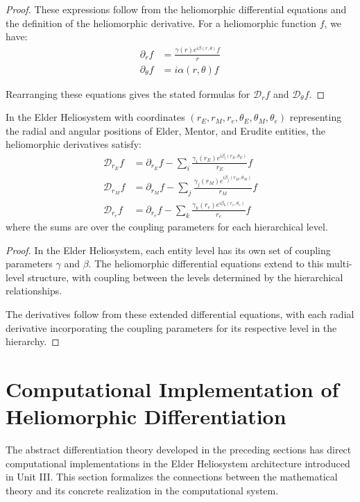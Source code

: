 \begin{proof}
These expressions follow from the heliomorphic differential equations and the definition of the heliomorphic derivative. For a heliomorphic function $f$, we have:
\begin{align}
\partial_rf &= \frac{\gamma(r)e^{i\beta(r,\theta)}f}{r}\\
\partial_\theta f &= i\alpha(r,\theta)f
\end{align}

Rearranging these equations gives the stated formulas for $\mathcal{D}_rf$ and $\mathcal{D}_\theta f$.
\end{proof}

\begin{theorem}
In the Elder Heliosystem with coordinates $(r_E, r_M, r_e, \theta_E, \theta_M, \theta_e)$ representing the radial and angular positions of Elder, Mentor, and Erudite entities, the heliomorphic derivatives satisfy:
\begin{align}
\mathcal{D}_{r_E}f &= \partial_{r_E}f - \sum_{i} \frac{\gamma_i(r_E)e^{i\beta_i(r_E,\theta_E)}}{r_E}f\\
\mathcal{D}_{r_M}f &= \partial_{r_M}f - \sum_{j} \frac{\gamma_j(r_M)e^{i\beta_j(r_M,\theta_M)}}{r_M}f\\
\mathcal{D}_{r_e}f &= \partial_{r_e}f - \sum_{k} \frac{\gamma_k(r_e)e^{i\beta_k(r_e,\theta_e)}}{r_e}f
\end{align}
where the sums are over the coupling parameters for each hierarchical level.
\end{theorem}

\begin{proof}
In the Elder Heliosystem, each entity level has its own set of coupling parameters $\gamma$ and $\beta$. The heliomorphic differential equations extend to this multi-level structure, with coupling between the levels determined by the hierarchical relationships.

The derivatives follow from these extended differential equations, with each radial derivative incorporating the coupling parameters for its respective level in the hierarchy.
\end{proof}

\section{Computational Implementation of Heliomorphic Differentiation}

The abstract differentiation theory developed in the preceding sections has direct computational implementations in the Elder Heliosystem architecture introduced in Unit III. This section formalizes the connections between the mathematical theory and its concrete realization in the computational system.

